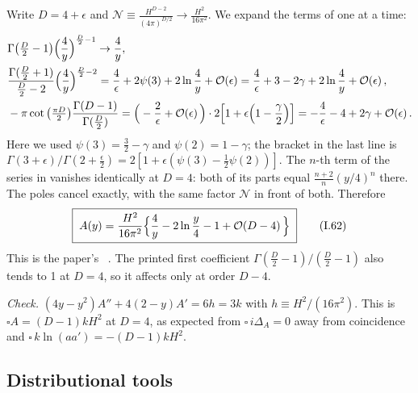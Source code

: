 Write $D=4+\epsilon$ and $\mathcal N\equiv\frac{H^{D-2}}{(4\pi)^{D/2}}\to\frac{H^2}{16\pi^2}$.
We expand the terms of  one at a time:
\begin{equation}
\begin{aligned}
&\Gamma\big(\tfrac D2-1\big)\Big(\frac4y\Big)^{\frac D2-1}\to\frac4y,\\
&\frac{\Gamma(\frac D2+1)}{\frac D2-2}\Big(\frac4y\Big)^{\frac D2-2}=\frac4\epsilon+2\psi(3)+2\ln\frac4y+\mathcal{O}\!\left(\epsilon\right)
=\frac4\epsilon+3-2\gamma+2\ln\frac4y+\mathcal{O}\!\left(\epsilon\right),\\
&-\pi\cot\big(\tfrac{\pi D}{2}\big)\frac{\Gamma(D-1)}{\Gamma(\frac D2)}=\Big(-\frac2\epsilon+\mathcal{O}\!\left(\epsilon\right)\Big)\cdot2\Big[1+\epsilon\Big(1-\frac\gamma2\Big)\Big]
=-\frac4\epsilon-4+2\gamma+\mathcal{O}\!\left(\epsilon\right).
\end{aligned}
\end{equation}
Here we used $\psi(3)=\frac32-\gamma$ and $\psi(2)=1-\gamma$; the bracket in the last line is
$\Gamma(3+\epsilon)/\Gamma(2+\frac\epsilon2)=2[1+\epsilon(\psi(3)-\frac12\psi(2))]$.
The $n$-th term of the series in  vanishes identically at $D=4$: both of its parts equal $\frac{n+2}{n}(y/4)^n$ there.
The poles cancel exactly, with the same factor $\mathcal N$ in front of both. Therefore
\begin{equation*}
\boxed{\;A(y)=\frac{H^2}{16\pi^2}\Big\{\frac4y-2\ln\frac y4-1+\mathcal{O}\!\left(D-4\right)\Big\}\;}
\tag{I.62}\label{eq:ch04:62}
\end{equation*}
This is the paper's ~\chIVok.
The printed first coefficient $\Gamma(\frac D2-1)/(\frac D2-1)$ also tends to 1 at $D=4$, so it affects  only at order $D-4$.

\emph{Check.} $(4y-y^2)A''+4(2-y)A'=6h=3k$ with $h\equiv H^2/(16\pi^2)$.
This is $\square A=(D-1)kH^2$ at $D=4$, as expected from $\square\,i\Delta_A=0$ away from coincidence and $\square\,k\ln(aa')=-(D-1)kH^2$.

\subsection{Distributional tools \texorpdfstring{\tD}{}}


